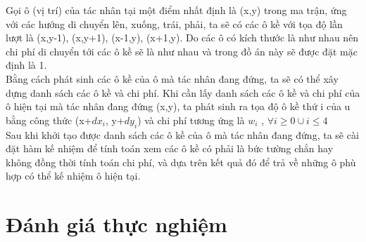 \documentclass[11pt]{scrartcl} %
\begin{document}
Gọi ô (vị trí) của tác nhân tại một điểm nhất định là (x,y) trong ma trận, ứng với các hướng di chuyển lên, xuống, trái, phải, ta sẽ có các ô kề với tọa độ lần lượt là (x,y-1), (x,y+1), (x-1,y), (x+1,y). Do các ô có kích thước là như nhau nên chi phí di chuyển tới các ô kề sẽ là như nhau và trong đồ án này sẽ được đặt mặc định là 1.\\

Bằng cách phát sinh các ô kề của ô mà tác nhân đang đứng, ta sẽ có thể xây dựng danh sách các ô kề và chi phí. Khi cần lấy danh sách các ô kề và chi phí của ô hiện tại mà tác nhân đang đứng (x,y), ta phát sinh ra tọa độ ô kề thứ i của u bằng công thức (x+$dx_{i}$, y+$dy_{i}$) và chi phí tương ứng là $w_{i}$ , $\forall{i\ge0}\cup{i\le4}$\\

Sau khi khởi tạo được danh sách các ô kề của ô mà tác nhân đang đứng, ta sẽ cài đặt hàm kế nhiệm để tính toán xem các ô kề có phải là bức tường chắn hay không đồng thời tính toán chi phí, và dựa trên kết quả đó để trả về những ô phù hợp có thể kế nhiệm ô hiện tại.

\newpage
\section{Đánh giá thực nghiệm}
\end{document}
